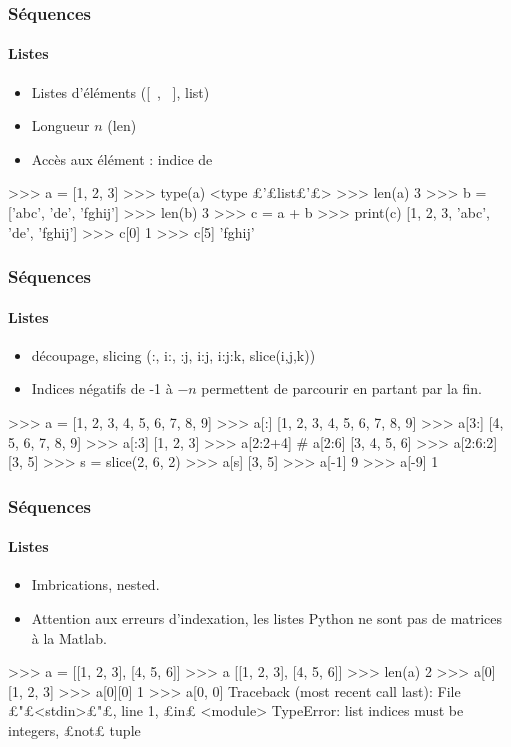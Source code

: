 \begin{frame}[fragile]
\frametitle{Séquences}
\framesubtitle{Listes}
\begin{itemize}
 \item Listes d'éléments ([\ , \ ], list)
 \item Longueur $n$ (len)
 \item Accès aux élément : indice de \color{red}{0 à $n-1$}
\end{itemize}
\begin{pythonConsole}
>>> a = [1, 2, 3]
>>> type(a)
<type £'£list£'£>
>>> len(a)
3
>>> b = ['abc', 'de', 'fghij']
>>> len(b)
3
>>> c = a + b
>>> print(c)
[1, 2, 3, 'abc', 'de', 'fghij']
>>> c[0]
1
>>> c[5]
'fghij'
\end{pythonConsole}
\end{frame}
\begin{frame}[fragile]
\frametitle{Séquences}
\framesubtitle{Listes}
\begin{itemize}
 \item découpage, slicing (:, i:, :j, i:j, i:j:k, slice(i,j,k))
 \item Indices négatifs de -1 à $-n$ permettent de parcourir en partant par la fin. 
\end{itemize}
\begin{pythonConsole}
>>> a = [1, 2, 3, 4, 5, 6, 7, 8, 9]
>>> a[:]
[1, 2, 3, 4, 5, 6, 7, 8, 9]
>>> a[3:]
[4, 5, 6, 7, 8, 9]
>>> a[:3]
[1, 2, 3]
>>> a[2:2+4] # a[2:6]
[3, 4, 5, 6]
>>> a[2:6:2]
[3, 5]
>>> s = slice(2, 6, 2)
>>> a[s]
[3, 5]
>>> a[-1]
9 
>>> a[-9]
1 
\end{pythonConsole}
\end{frame}
\begin{frame}[fragile]
\frametitle{Séquences}
\framesubtitle{Listes}
\begin{itemize}
 \item Imbrications, nested.
 \item Attention aux erreurs d'indexation, les listes Python ne sont pas de matrices à la Matlab. 
\end{itemize}
\begin{pythonConsole}
>>> a = [[1, 2, 3], [4, 5, 6]]
>>> a
[[1, 2, 3], [4, 5, 6]]
>>> len(a)
2
>>> a[0]
[1, 2, 3]
>>> a[0][0]
1
>>> a[0, 0]
Traceback (most recent call last):
  File £"£<stdin>£"£, line 1, £in£ <module>
TypeError: list indices must be integers, £not£ tuple
\end{pythonConsole}
\end{frame}
